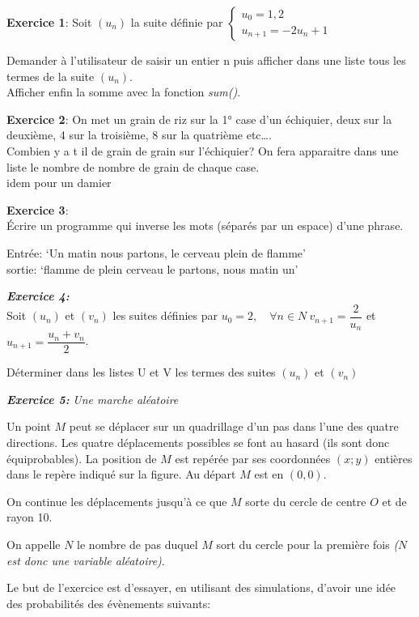\documentclass{article}
\begin{document}
\textbf{Exercice 1}: Soit $(u_n)$ la suite définie par $ \left\lbrace  \begin{array}{l}
u_0=1,2 \\
u_{n+1}=-2u_n+1
  \end{array}
\right.$

Demander à l'utilisateur de saisir un entier n puis afficher dans une
liste tous les termes de la suite $(u_n)$.\\Afficher enfin la somme avec
la fonction \emph{sum()}.

    \textbf{Exercice 2}: On met un grain de riz sur la 1° case d'un
échiquier, deux sur la deuxième, 4 sur la troisième, 8 sur la quatrième
etc\ldots{}.\\Combien y a t il de grain de grain sur l'échiquier? On
fera apparaitre dans une liste le nombre de nombre de grain de chaque
case.\\idem pour un damier

    \textbf{Exercice 3}:\\Écrire un programme qui inverse les mots (séparés
par un espace) d'une phrase.

Entrée: `Un matin nous partons, le cerveau plein de flamme'\\sortie:
`flamme de plein cerveau le partons, nous matin un'

    \textbf{\emph{Exercice 4:}}\\Soit $(u_n)$ et $(v_n)$ les suites définies
par $u_0=2,\quad \forall n \in N \ v_{n+1}=\dfrac{2}{u_n}$ et
$u_{n+1}=\dfrac{u_n+v_n}{2}$.

Déterminer dans les listes U et V les termes des suites $(u_n)$ et
$(v_n)$

    \textbf{\emph{Exercice 5:}} \emph{Une marche aléatoire}

Un point $M$ peut se déplacer sur un quadrillage d'un pas dans l'une des
quatre directions. Les quatre déplacements possibles se font au hasard
(ils sont donc équiprobables). La position de $M$ est repérée par ses
coordonnées $(x;y)$ entières dans le repère indiqué sur la figure. Au
départ $M$ est en $(0,0)$.

On continue les déplacements jusqu'à ce que $M$ sorte du cercle de
centre $O$ et de rayon 10.

On appelle $N$ le nombre de pas duquel $M$ sort du cercle pour la
première fois \emph{($N$ est donc une variable aléatoire)}.

Le but de l'exercice est d'essayer, en utilisant des simulations,
d'avoir une idée des probabilités des évènements suivants:
\end{document}
